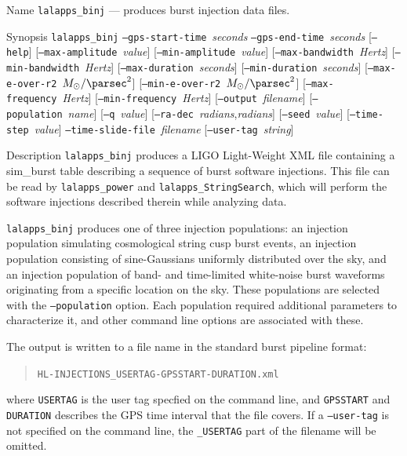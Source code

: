 \documentclass[10pt]{article}
\newcommand{\prog}[1]{\texttt{#1}}
\newcommand{\option}[1]{\texttt{#1}}
\newcommand{\parm}[1]{\textit{#1}}
\newenvironment{entry}%
{\begin{list}{}{\renewcommand{\makelabel}[1]%
{\parbox[b]{\labelwidth}{\makebox[0pt][l]{\textbf{##1}}\\}}%
\setlength{\labelwidth}{1em}%
\setlength{\labelsep}{1em}%
\setlength{\leftmargin}{2em}%
\setlength{\topsep}{\medskipamount}%
\setlength{\itemsep}{\medskipamount}%
\setlength{\parsep}{\medskipamount}%
\setlength{\listparindent}{0pt}}}
{\end{list}}
\begin{document}
\begin{entry}
\item[Name]
\prog{lalapps\_binj} --- produces burst injection data files.

\item[Synopsis]
\prog{lalapps\_binj}
\option{--gps-start-time}~\parm{seconds}
\option{--gps-end-time}~\parm{seconds}
[\option{--help}]
[\option{--max-amplitude}~\parm{value}]
[\option{--min-amplitude}~\parm{value}]
[\option{--max-bandwidth}~\parm{Hertz}]
[\option{--min-bandwidth}~\parm{Hertz}]
[\option{--max-duration}~\parm{seconds}]
[\option{--min-duration}~\parm{seconds}]
[\option{--max-e-over-r2}~\parm{\(\Msol/\text{\parsec}^{2}\)}]
[\option{--min-e-over-r2}~\parm{\(\Msol/\text{\parsec}^{2}\)}]
[\option{--max-frequency}~\parm{Hertz}]
[\option{--min-frequency}~\parm{Hertz}]
[\option{--output}~\parm{filename}]
[\option{--population}~\parm{name}]
[\option{--q}~\parm{value}]
[\option{--ra-dec}~\parm{radians},\parm{radians}]
[\option{--seed}~\parm{value}]
[\option{--time-step}~\parm{value}]
\option{--time-slide-file}~\parm{filename}
[\option{--user-tag}~\parm{string}]

\item[Description] 
\prog{lalapps\_binj} produces a LIGO Light-Weight XML file containing a
sim\_burst table describing a sequence of burst software injections.  This
file can be read by \prog{lalapps\_power} and \prog{lalapps\_StringSearch},
which will perform the software injections described therein while
analyzing data.

\prog{lalapps\_binj} produces one of three injection populations:  an
injection population simulating cosmological string cusp burst events, an
injection population consisting of sine-Gaussians uniformly distributed
over the sky, and an injection population of band- and time-limited
white-noise burst waveforms originating from a specific location on the
sky.  These populations are selected with the \option{--population} option.
Each population required additional parameters to characterize it, and
other command line options are associated with these.

The output is written to a file name in the standard burst pipeline format:
\begin{quote}
\texttt{HL-INJECTIONS\_USERTAG-GPSSTART-DURATION.xml}
\end{quote}
where \texttt{USERTAG} is the user tag specfied on the command line, and
\texttt{GPSSTART} and \texttt{DURATION} describes the GPS time interval
that the file covers.  If a \option{--user-tag} is not specified on the
command line, the \texttt{\_USERTAG} part of the filename will be omitted.


\end{entry}
\end{document}
